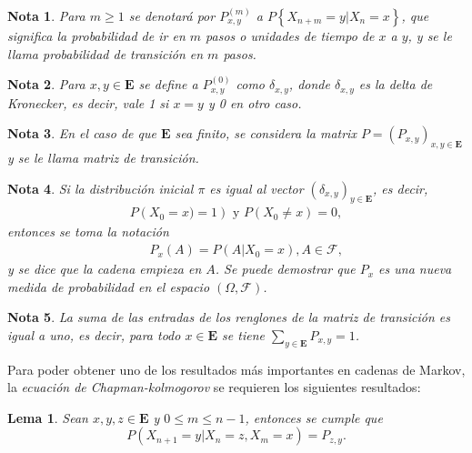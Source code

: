 \documentclass{article}
\newtheorem{Note}{Nota}[section]
\newtheorem{Lema}{Lema}[section]
\newcommand{\Eb}{\mathbf{E}}
\numberwithin{equation}{section}
\begin{document}
\begin{Note}
Para $m\geq1$ se denotar\'a por $P^{(m)}_{x,y}$ a $P\left\{X_{n+m}=y|X_{n}=x\right\}$, que significa la probabilidad de ir en $m$ pasos o unidades de tiempo de $x$ a $y$, y se le llama \textit{probabilidad de transici\'on en $m$ pasos}.
\end{Note}

\begin{Note}
Para $x,y\in\mathbf{E}$ se define a $P^{(0)}_{x,y}$ como $\delta_{x,y}$, donde $\delta_{x,y}$ es la delta de Kronecker, es decir, vale 1 si $x=y$ y 0 en otro caso.
\end{Note}


\begin{Note}
En el caso de que $\mathbf{E}$ sea finito, se considera la matrix $P=\left(P_{x,y}\right)_{x,y\in \mathbf{E}}$ y se le llama \textit{matriz de transici\'on}.
\end{Note}


\begin{Note}
Si la distribuci\'on inicial $\pi$ es igual al vector $\left(\delta_{x,y}\right)_{y\in\mathbf{E}}$, es decir,
\begin{eqnarray*}
P\left(X_{0}=x)=1\right)\textrm{ y }P\left(X_{0}\neq x\right)=0,
\end{eqnarray*}
entonces se toma la notaci\'on 
\begin{eqnarray}
&&P_{x}\left(A\right)=P\left(A|X_{0}=x\right),A\in\mathcal{F},
\end{eqnarray}
y se dice que la cadena empieza en $A$. Se puede demostrar que $P_{x}$ es una nueva medida de probabilidad en el espacio $\left(\Omega,\mathcal{F}\right)$.
\end{Note}


\begin{Note}
La suma de las entradas de los renglones de la matriz de transici\'on es igual a uno, es decir, para todo $x\in \mathbf{E}$ se tiene $\sum_{y\in\mathbf{E}}P_{x,y}=1$.
\end{Note}

Para poder obtener uno de los resultados m\'as importantes en cadenas de Markov, la \textit{ecuaci\'on de Chapman-kolmogorov} se requieren los siguientes resultados:

\begin{Lema}
Sean $x,y,z\in\Eb$ y $0\leq m\leq n-1$, entonces se cumple que
\begin{equation}
P\left(X_{n+1}=y|X_{n}=z,X_{m}=x\right)=P_{z,y}.
\end{equation}
\end{Lema}
\end{document}
